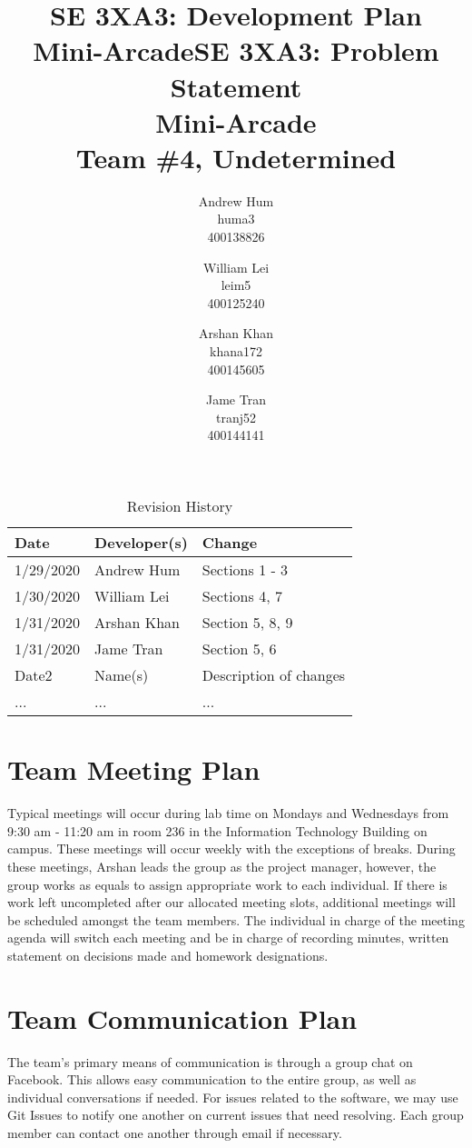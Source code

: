 \documentclass{article}
\title{SE 3XA3: Development Plan\\Mini-Arcade}
\title{SE 3XA3: Problem Statement \\ Mini-Arcade \\{\large Team \#4, Undetermined}}
\author{Andrew Hum \\ huma3 \\ 400138826 \and
		William Lei \\ leim5 \\ 400125240 \and
		Arshan Khan \\ khana172 \\ 400145605 \and
		Jame Tran \\ tranj52 \\ 400144141
}
\date{}
\begin{document}
\begin{table}[hp]
\caption{Revision History} \label{TblRevisionHistory}
\begin{tabularx}{\textwidth}{llX}
\toprule
\textbf{Date} & \textbf{Developer(s)} & \textbf{Change}\\
\midrule
1/29/2020 & Andrew Hum & Sections 1 - 3\\
1/30/2020 & William Lei & Sections 4, 7\\
1/31/2020 & Arshan Khan & Section 5, 8, 9 \\
1/31/2020 & Jame Tran & Section 5, 6 \\
Date2 & Name(s) & Description of changes\\
... & ... & ...\\
\bottomrule
\end{tabularx}
\end{table}

\newpage

\maketitle

\section{Team Meeting Plan}

Typical meetings will occur during lab time on Mondays and Wednesdays from 9:30 am - 11:20 am in room 236 in the Information Technology Building on campus. These meetings will occur weekly with the exceptions of breaks. During these meetings, Arshan leads the group as the project manager, however, the group works as equals to assign appropriate work to each individual. If there is work left uncompleted after our allocated meeting slots, additional meetings will be scheduled amongst the team members. The individual in charge of the meeting agenda will switch each meeting and be in charge of recording minutes, written statement on decisions made and homework designations.

\section{Team Communication Plan}

The team's primary means of communication is through a group chat on Facebook. This allows easy communication to the entire group, as well as individual conversations if needed. For issues related to the software, we may use Git Issues to notify one another on current issues that need resolving. Each group member can contact one another through email if necessary.
\end{document}
